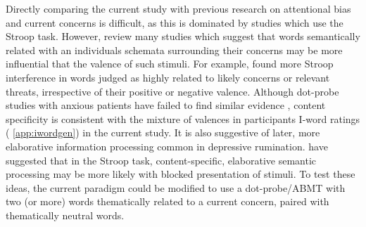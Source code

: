 \documentclass[man,floatsintext,a4paper,biblatex]{apa6}\usepackage[]{graphicx}\usepackage[]{color}
\begin{document}
Directly comparing the current study with previous research on attentional
bias and current concerns is difficult, as this is dominated by studies
which use the Stroop task. However, \parencite{williams_cognitive_1997}
review many studies which suggest that words semantically related
with an individuals schemata surrounding their concerns may be
more influential that the valence of such stimuli. For example,
\parencite{mathews_emotionality_1993} found more Stroop interference in
words judged as highly related to likely concerns or relevant threats,
irrespective of their positive or negative valence. Although dot-probe
studies with anxious patients have failed to find similar evidence
\parencite{musa_selective_2003}, content specificity is consistent
with the mixture of valences in participants I-word ratings (
\cref{app:iwordgen}) in the current study. It is
also suggestive of later, more elaborative information processing common
in depressive rumination.  \textcite[][p. 309]{mogg_subliminal_1993}
have suggested that in the Stroop task, content-specific, elaborative
semantic processing may be more likely with blocked presentation of
stimuli. To test these ideas, the current paradigm could be modified to
use a dot-probe/ABMT with two (or more) words thematically related to
a current concern, paired with thematically neutral words.
\end{document}
